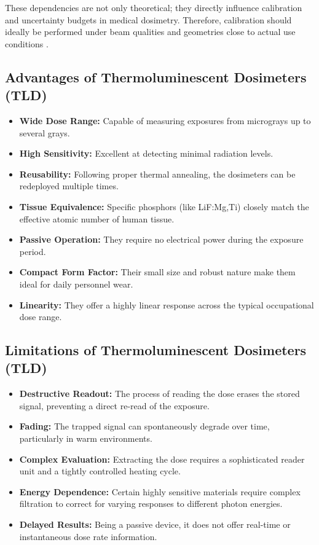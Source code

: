 These dependencies are not only theoretical; they directly influence calibration and uncertainty budgets in medical dosimetry. Therefore, calibration should ideally be performed under beam qualities and geometries close to actual use conditions \cite{kry_aapm_2020,rivera_thermoluminescence_2012}.


\subsection{Advantages of Thermoluminescent Dosimeters (TLD)}
\begin{itemize}
    \item \textbf{Wide Dose Range:} Capable of measuring exposures from micrograys up to several grays.
    \item \textbf{High Sensitivity:} Excellent at detecting minimal radiation levels.
    \item \textbf{Reusability:} Following proper thermal annealing, the dosimeters can be redeployed multiple times.
    \item \textbf{Tissue Equivalence:} Specific phosphors (like LiF:Mg,Ti) closely match the effective atomic number of human tissue.
    \item \textbf{Passive Operation:} They require no electrical power during the exposure period.
    \item \textbf{Compact Form Factor:} Their small size and robust nature make them ideal for daily personnel wear.
    \item \textbf{Linearity:} They offer a highly linear response across the typical occupational dose range.
\end{itemize}

\subsection{Limitations of Thermoluminescent Dosimeters (TLD)}
\begin{itemize}
    \item \textbf{Destructive Readout:} The process of reading the dose erases the stored signal, preventing a direct re-read of the exposure.
    \item \textbf{Fading:} The trapped signal can spontaneously degrade over time, particularly in warm environments.
    \item \textbf{Complex Evaluation:} Extracting the dose requires a sophisticated reader unit and a tightly controlled heating cycle.
    \item \textbf{Energy Dependence:} Certain highly sensitive materials require complex filtration to correct for varying responses to different photon energies.
    \item \textbf{Delayed Results:} Being a passive device, it does not offer real-time or instantaneous dose rate information.
\end{itemize}

